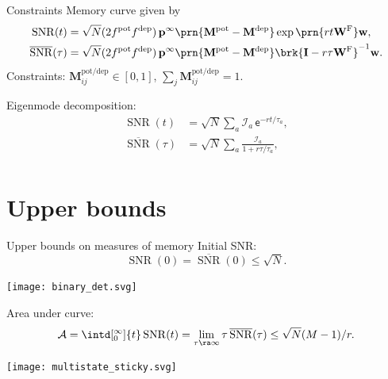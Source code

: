 \documentclass{beamer}%
\newcommand{\inv}{^{-1}}
\newcommand{\I}{\mathbf{I}}
\newcommand{\pr}{\mathbf{p}}
\newcommand{\eq}{\pr^\infty}
\newcommand{\w}{\mathbf{w}}
\newcommand{\W}{\mathbf{W}}
\newcommand{\frg}{\W^\mathrm{F}}
\newcommand{\M}{\mathbf{M}}
\DeclareMathOperator{\snr}{SNR}
\newcommand{\snrb}{\overline{\snr}}
\newcommand{\pot}{^{\text{pot}}}
\newcommand{\dep}{^{\text{dep}}}
\newcommand{\potdep}{^{\text{pot/dep}}}
\newcommand{\initial}{\mathcal{I}}
\newcommand{\area}{\mathcal{A}}
\renewcommand{\e}{\mathsf{e}}
\begin{document}
\begin{frame}{Constraints}
%
 Memory curve given by
 \begin{equation*}
 \begin{aligned}
   \snr(t) &=
      \sqrt{N}(2f\pot f\dep)\,
      \eq \prn{\M\pot-\M\dep}      \exp\prn{rt\frg} \w, \\
   \snrb(\tau) &=
      \sqrt{N}(2f\pot f\dep)\,
      \eq \prn{\M\pot-\M\dep}      \brk{\I - r\tau\frg}\inv \w. \\
 \end{aligned}
 \end{equation*}
 Constraints: \qquad $\M\potdep_{ij}\in[0,1]$, \qquad $\sum_j\M\potdep_{ij}=1$.

 \vp Eigenmode decomposition:
 \begin{equation*}
 \begin{aligned}
   \snr(t) &= \sqrt{N}\sum_a \initial_a \,\e^{-rt/\tau_a}, \\
   \snrb(\tau) &= \sqrt{N}\sum_a \frac{\initial_a }{1+r\tau/\tau_a}, \\
 \end{aligned}
 \end{equation*}
%
\end{frame}



\section{Upper bounds}



\begin{frame}{Upper bounds on measures of memory}
%
 Initial SNR:
 \begin{equation*}
   \snr(0) = \snrb(0) \leq \sqrt{N}.
 \end{equation*}
 \begin{center}
   \texttt{[image: binary\_det.svg]}
 \end{center}
 Area under curve:
 \begin{equation*}
   \area = \intd[_0^\infty]{t} \snr(t) = \lim_{\tau\ra\infty} \tau \, \snrb(\tau) \leq \sqrt{N}(M-1)/r.
 \end{equation*}
 \begin{center}
   \texttt{[image: multistate\_sticky.svg]}
 \end{center}
%
\end{frame}
\end{document}
